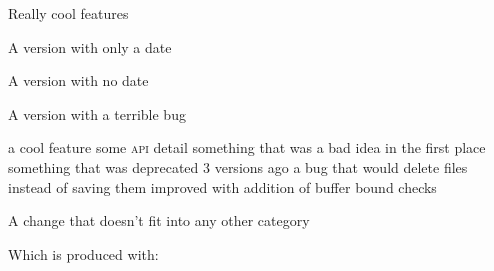 \documentclass{ltxdoc}
\begin{document}
\begin{changelog}[author=Rebecca Turner,
	sectioncmd=\subsection,
	title=Example changelog]
\begin{version}
	\added Really cool features
\end{version}

\begin{version}[date=2019-01-23]
	\item A version with only a date
\end{version}

\begin{version}[v=1.1.0]
	\item A version with no date
\end{version}

\begin{version}[v=1.0.1, yanked]
	\item A version with a terrible bug
\end{version}

\begin{version}[v=1.0.0, date=2018-10-26]
	\added a cool feature
	\changed some \textsc{api} detail
	\deprecated something that was a bad idea in the first place
	\removed something that was deprecated 3 versions ago
	\fixed a bug that would delete files instead of saving them
	\security improved with addition of buffer bound checks
	\item A change that doesn't fit into any other category
\end{version}
\end{changelog}

Which is produced with:
\end{document}
